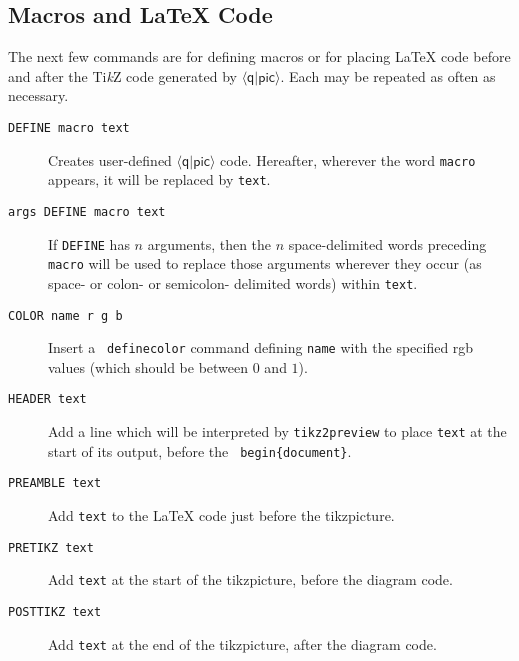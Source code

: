 \documentclass[twoside,12pt]{article}
\newcommand{\qpic}{$\langle\mathsf{q}|\mathsf{pic}\rangle$\xspace}
\newcommand{\TikZ}{Ti\emph{k}Z\xspace}
\begin{document}
\subsection{Macros and {\LaTeX} Code}
\label{sec-qpic-define} \label{sec-hypertarget}

The next few commands are for defining macros or for placing {\LaTeX} code before and after the \TikZ code generated
by \qpic.  Each may be repeated as often as necessary.

\begin{description}
\item[{\tt DEFINE macro text}] Creates user-defined \qpic code.  Hereafter, wherever the word {\tt macro}
appears, it will be replaced by {\tt text}.

\begin{minipage}[b]{3.2in}

\end{minipage} \hfill 

\item[{\tt args DEFINE macro text}] If {\tt DEFINE} has $n$ arguments, then the
  $n$ space-delimited words preceding {\tt macro} will be used to replace those
  arguments wherever they occur (as space- or colon- or semicolon- delimited
  words) within {\tt text}.

\begin{minipage}[b]{3.2in}

\end{minipage} \hfill 


\item[{\tt COLOR name r g b}] Insert a {\tt {} definecolor} command defining {\tt name} with the
specified rgb values (which should be between $0$ and $1$).

\item[{\tt HEADER text}] Add a line which will be interpreted by {\tt tikz2preview} to place
{\tt text} at the start of its output, before the {\tt {} begin\{document\}}.

\item[{\tt PREAMBLE text}] Add {\tt text} to the {\LaTeX} code just before the tikzpicture.

\item[{\tt PRETIKZ text}] Add {\tt text} at the start of the tikzpicture, before the diagram code.

\item[{\tt POSTTIKZ text}] Add {\tt text} at the end of the tikzpicture, after the diagram code.


\end{description}
\end{document}
